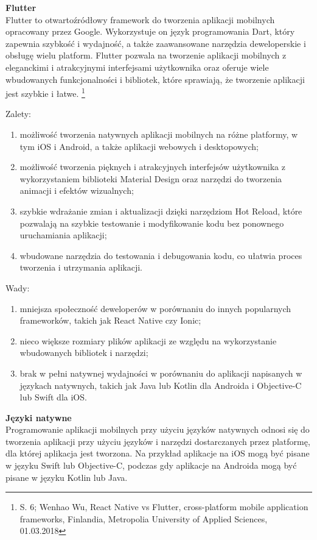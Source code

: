 \documentclass[12pt, a4paper, twoside, openany]{book}
\begin{document}
\textbf{Flutter\\}
\indent Flutter to otwartoźródłowy framework do tworzenia aplikacji mobilnych opracowany przez Google. Wykorzystuje on język programowania Dart, który zapewnia szybkość i wydajność, a także zaawansowane narzędzia deweloperskie i obsługę wielu platform. Flutter pozwala na tworzenie aplikacji mobilnych z eleganckimi i atrakcyjnymi interfejsami użytkownika oraz oferuje wiele wbudowanych funkcjonalności i bibliotek, które sprawiają, że tworzenie aplikacji jest szybkie i łatwe. \footnote{S. 6; Wenhao Wu, React Native vs Flutter, cross-platform mobile application frameworks, Finlandia, Metropolia University of Applied Sciences, 01.03.2018}
    
Zalety:
\begin{enumerate}[label=--]
    \item możliwość tworzenia natywnych aplikacji mobilnych na różne platformy, w tym iOS i Android, a także aplikacji webowych i desktopowych;
    \item możliwość tworzenia pięknych i atrakcyjnych interfejsów użytkownika z wykorzystaniem biblioteki Material Design oraz narzędzi do tworzenia animacji i efektów wizualnych;
    \item szybkie wdrażanie zmian i aktualizacji dzięki narzędziom Hot Reload, które pozwalają na szybkie testowanie i modyfikowanie kodu bez ponownego uruchamiania aplikacji;
    \item wbudowane narzędzia do testowania i debugowania kodu, co ułatwia proces tworzenia i utrzymania aplikacji.
\end{enumerate}

Wady:
\begin{enumerate}[label=--]
 \item mniejsza społeczność deweloperów w porównaniu do innych popularnych frameworków, takich jak React Native czy Ionic;
 \item nieco większe rozmiary plików aplikacji ze względu na wykorzystanie wbudowanych bibliotek i narzędzi;
 \item brak w pełni natywnej wydajności w porównaniu do aplikacji napisanych w językach natywnych, takich jak Java lub Kotlin dla Androida i Objective-C lub Swift dla iOS.
\end{enumerate}

\textbf{Języki natywne\\}
\indent Programowanie aplikacji mobilnych przy użyciu języków natywnych odnosi się do tworzenia aplikacji przy użyciu języków i narzędzi dostarczanych przez platformę, dla której aplikacja jest tworzona. Na przykład aplikacje na iOS mogą być pisane w języku Swift lub Objective-C, podczas gdy aplikacje na Androida mogą być pisane w języku Kotlin lub Java.
    
\end{document}
